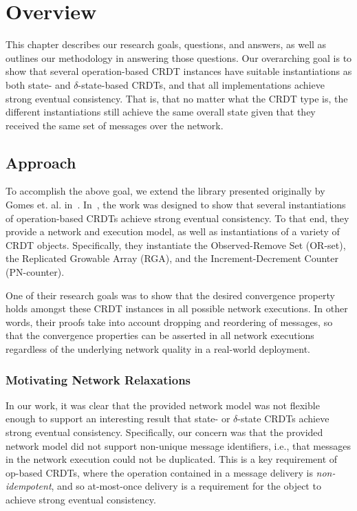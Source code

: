 \chapter{Overview}
\label{chap:overview}

This chapter describes our research goals, questions, and answers, as well as
outlines our methodology in answering those questions. Our overarching goal is
to show that several operation-based CRDT instances have suitable instantiations
as both state- and $\delta$-state-based CRDTs, and that all implementations
achieve strong eventual consistency. That is, that no matter what the CRDT type
is, the different instantiations still achieve the same overall state given that
they received the same set of messages over the network.

\section{Approach}
To accomplish the above goal, we extend the library presented originally by
Gomes et. al. in~\cite{gomes17}. In~\citep{gomes17}, the work was designed to
show that several instantiations of operation-based CRDTs achieve strong
eventual consistency. To that end, they provide a network and execution model,
as well as instantiations of a variety of CRDT objects. Specifically, they
instantiate the Observed-Remove Set (OR-set), the Replicated Growable Array
(RGA), and the Increment-Decrement Counter (PN-counter).

One of their research goals was to show that the desired convergence property
holds amongst these CRDT instances in all possible network executions. In other
words, their proofs take into account dropping and reordering of messages, so
that the convergence properties can be asserted in all network executions
regardless of the underlying network quality in a real-world deployment.

\subsection{Motivating Network Relaxations}
In our work, it was clear that the provided network model was not flexible
enough to support an interesting result that state- or $\delta$-state
CRDTs achieve strong eventual consistency. Specifically, our concern was that
the provided network model did not support non-unique message identifiers, i.e.,
that messages in the network execution could not be duplicated. This is a key
requirement of op-based CRDTs, where the operation contained in a message
delivery is \textit{non-idempotent}, and so at-most-once delivery is a
requirement for the object to achieve strong eventual consistency.

